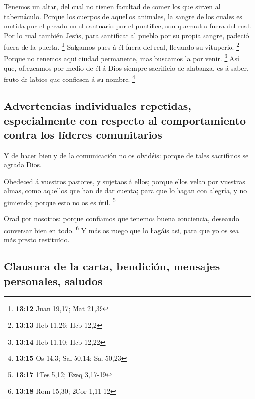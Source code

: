  Tenemos un altar, del cual no tienen facultad de comer los
que sirven al tabernáculo.  Porque los cuerpos de aquellos
animales, la sangre de los cuales es metida por el pecado en el
santuario por el pontífice, son quemados fuera del real. 
Por lo cual también Jesús, para santificar al pueblo por su propia
sangre, padeció fuera de la puerta. \footnote{\textbf{13:12} Juan 19,17;
  Mat 21,39}  Salgamos pues á él fuera del real, llevando
su vituperio. \footnote{\textbf{13:13} Heb 11,26; Heb 12,2}
 Porque no tenemos aquí ciudad permanente, mas buscamos la
por venir. \footnote{\textbf{13:14} Heb 11,10; Heb 12,22} 
Así que, ofrezcamos por medio de él á Dios siempre sacrificio de
alabanza, es á saber, fruto de labios que confiesen á su nombre.
\footnote{\textbf{13:15} Os 14,3; Sal 50,14; Sal 50,23}

\hypertarget{advertencias-individuales-repetidas-especialmente-con-respecto-al-comportamiento-contra-los-luxedderes-comunitarios}{%
\subsection{Advertencias individuales repetidas, especialmente con
respecto al comportamiento contra los líderes
comunitarios}\label{advertencias-individuales-repetidas-especialmente-con-respecto-al-comportamiento-contra-los-luxedderes-comunitarios}}

 Y de hacer bien y de la comunicación no os olvidéis:
porque de tales sacrificios se agrada Dios.

 Obedeced á vuestros pastores, y sujetaos á ellos; porque
ellos velan por vuestras almas, como aquellos que han de dar cuenta;
para que lo hagan con alegría, y no gimiendo; porque esto no os es útil.
\footnote{\textbf{13:17} 1Tes 5,12; Ezeq 3,17-19}

 Orad por nosotros: porque confiamos que tenemos buena
conciencia, deseando conversar bien en todo. \footnote{\textbf{13:18}
  Rom 15,30; 2Cor 1,11-12}  Y más os ruego que lo hagáis
así, para que yo os sea más presto restituído.

\hypertarget{clausura-de-la-carta-bendiciuxf3n-mensajes-personales-saludos}{%
\subsection{Clausura de la carta, bendición, mensajes personales,
saludos}\label{clausura-de-la-carta-bendiciuxf3n-mensajes-personales-saludos}}

